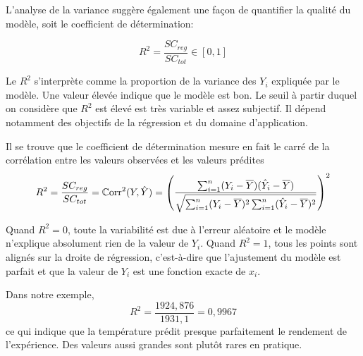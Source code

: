 L'analyse de la variance suggère également une façon de quantifier la qualité du modèle, soit le coefficient de détermination:

\begin{equation}
R^2 =\frac{SC_{reg}} {SC_{tot}} \in[0,1]
\end{equation}

Le $R^2$ s'interprète comme la proportion de la variance des $Y_i$ expliquée par le modèle. Une valeur élevée indique que le modèle est bon. Le seuil à partir duquel on considère que $R^2$ est élevé est très variable et assez subjectif. Il dépend notamment des objectifs de la régression et du domaine d'application.

Il se trouve que le coefficient de détermination mesure en fait le carré de la corrélation entre les valeurs observées et les valeurs prédites
 \[R^2 = \frac{SC_{reg}} {SC_{tot}} = \mathbb{C}\text{orr}^2 (Y, \hat{Y})=\left(\frac{\sum_{i=1}^n (Y_i - \overline{Y})(\hat{Y}_i - \overline{Y})}{\sqrt{\sum_{i=1}^n (Y_i - \overline{Y})^2\sum_{i=1}^n(\hat{Y}_i - \overline{Y})^2}}\right)^2
\]

Quand $R^2=0$, toute la variabilit\'e est due \`a l'erreur al\'eatoire
et le mod\`ele n'explique absolument rien de la valeur de $Y_i$. Quand $R^2=1$, tous les points sont alignés sur la droite de r\'egression, c'est-à-dire que l'ajustement du mod\`ele est parfait et que la valeur de $Y_i$ est une fonction exacte de $x_i$.

\begin{exemple}
Dans notre exemple,
$$R^2 = \frac{1924,876}{1931,1} = 0,9967$$
ce qui indique que la température prédit presque parfaitement le rendement de l'expérience. Des valeurs aussi grandes sont plutôt rares en pratique.
\end{exemple}

